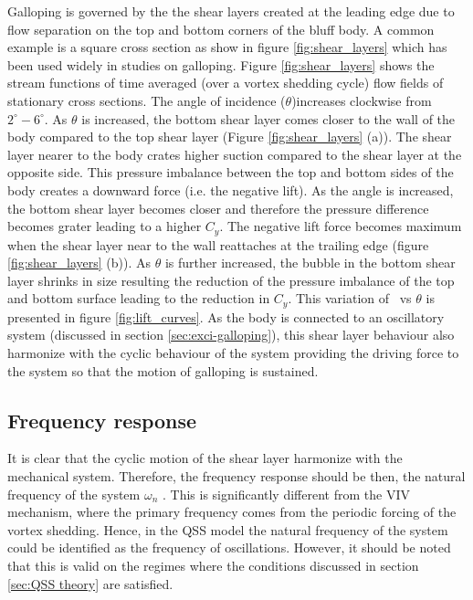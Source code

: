 Galloping is governed by the the shear layers created at the leading edge due to flow separation on the top and bottom corners of the bluff body. A common example is a square cross section as show in figure \ref{fig:shear_layers} which has been used widely in studies on galloping. Figure \ref{fig:shear_layers} shows the stream functions of time averaged (over a vortex shedding cycle) flow fields of stationary cross sections. The angle of incidence ($\theta$)increases clockwise from $2^{\circ}-6^{\circ}$. As $\theta$ is increased, the bottom shear layer comes closer to the wall of the body compared to the top shear layer (Figure \ref{fig:shear_layers} (a)). The shear layer nearer to the body crates higher suction compared to the shear layer at the opposite side. This pressure imbalance between the top and bottom sides of the body creates a downward force (i.e. the negative lift). As the angle is increased, the bottom shear layer becomes closer and therefore the pressure difference becomes grater leading to a higher $C_{y}$. The negative lift force becomes maximum when the shear layer near to the wall reattaches at the trailing edge (figure \ref{fig:shear_layers} (b)). As $\theta$ is further increased, the bubble in the bottom shear layer shrinks in size resulting the reduction of the pressure imbalance of the top and bottom surface leading to the reduction in $C_{y}$. This variation of \cy\ vs $\theta$ is presented in figure \ref{fig:lift_curves}. As the body is connected to an oscillatory system (discussed in section \ref{sec:exci-galloping}), this shear layer behaviour also harmonize with the cyclic behaviour of the system providing the driving force to the system so that the motion of galloping is sustained.



\subsection{Frequency response}
 
 It is clear that the cyclic motion of the shear layer harmonize with the mechanical system. Therefore, the frequency response should be then, the natural frequency of the system $\omega_{n}$ \citep{Paidoussis2010}. This is significantly different from the VIV mechanism, where the primary frequency comes from the periodic forcing of the vortex shedding. Hence, in the QSS model the natural frequency of the system could be identified as the frequency of oscillations. However, it should be  noted that this is valid on the regimes where the conditions discussed in section \ref{sec:QSS theory} are satisfied. 
 
